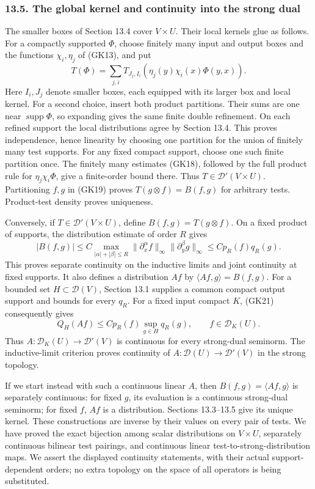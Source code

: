 \documentclass[
  11pt,
]{article}
\begin{document}
\subsubsection{13.5. The global kernel and continuity into the strong
dual}\label{the-global-kernel-and-continuity-into-the-strong-dual}

The smaller boxes of Section 13.4 cover \(V\times U\). Their local
kernels glue as follows. For a compactly supported \(\Phi\), choose
finitely many input and output boxes and the functions \(\chi_i,\eta_j\)
of (GK13), and put \[
 T(\Phi)=\sum_{j,i}T_{J_j,I_i}(\eta_j(y)\chi_i(x)\Phi(y,x)).
 \tag{GK20}
\] Here \(I_i,J_j\) denote smaller boxes, each equipped with its larger
box and local kernel. For a second choice, insert both product
partitions. Their sums are one near \(\operatorname{supp}\Phi\), so
expanding gives the same finite double refinement. On each refined
support the local distributions agree by Section 13.4. This proves
independence, hence linearity by choosing one partition for the union of
finitely many test supports. For any fixed compact support, choose one
such finite partition once. The finitely many estimates (GK18), followed
by the full product rule for \(\eta_j\chi_i\Phi\), give a finite-order
bound there. Thus \(T\in\mathcal D'(V\times U)\). Partitioning \(f,g\)
in (GK19) proves \(T(g\otimes f)=B(f,g)\) for arbitrary tests.
Product-test density proves uniqueness.

Conversely, if \(T\in\mathcal D'(V\times U)\), define
\(B(f,g)=T(g\otimes f)\). On a fixed product of supports, the
distribution estimate of order \(R\) gives \[
 |B(f,g)|\leq C
 \max_{|\alpha|+|\beta|\leq R}
       \|\partial_x^\alpha f\|_\infty
       \|\partial_y^\beta g\|_\infty
 \leq C p_R(f)q_R(g).
 \tag{GK21}
\] This proves separate continuity on the inductive limits and joint
continuity at fixed supports. It also defines a distribution \(Af\) by
\(\langle Af,g\rangle=B(f,g)\). For a bounded set
\(H\subset\mathcal D(V)\), Section 13.1 supplies a common compact output
support and bounds for every \(q_R\). For a fixed input compact \(K\),
(GK21) consequently gives \[
 Q_H(Af)\leq C p_R(f)\sup_{g\in H}q_R(g),\qquad f\in\mathcal D_K(U).
 \tag{GK22}
\] Thus \(A:\mathcal D_K(U)\to\mathcal D'(V)\) is continuous for every
strong-dual seminorm. The inductive-limit criterion proves continuity of
\(A:\mathcal D(U)\to\mathcal D'(V)\) in the strong topology.

If we start instead with such a continuous linear \(A\), then
\(B(f,g)=\langle Af,g\rangle\) is separately continuous: for fixed
\(g\), its evaluation is a continuous strong-dual seminorm; for fixed
\(f\), \(Af\) is a distribution. Sections 13.3--13.5 give its unique
kernel. These constructions are inverse by their values on every pair of
tests. We have proved the exact bijection among scalar distributions on
\(V\times U\), separately continuous bilinear test pairings, and
continuous linear test-to-strong-distribution maps. We assert the
displayed continuity statements, with their actual support-dependent
orders; no extra topology on the space of all operators is being
substituted.
\end{document}
